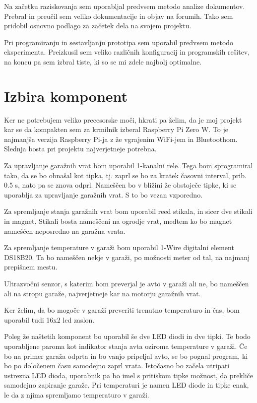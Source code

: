 \documentclass[11pt]{article}
\begin{document}
Na začetku raziskovanja sem uporabljal predvsem metodo analize dokumentov. Prebral in preučil sem veliko dokumentacije in objav na forumih. Tako sem pridobil osnovno podlago za začetek dela na svojem projektu.

Pri programiranju in sestavljanju prototipa sem uporabil predvsem metodo eksperimenta. Preizkusil sem veliko različnih konfiguracij in programskih rešitev, na koncu pa sem izbral tiste, ki so se mi zdele najbolj optimalne.
\newpage

\section{Izbira komponent}
  Ker ne potrebujem veliko precesorske moči, hkrati pa želim, da je moj projekt kar se da kompakten sem za krmilnik izberal Raspberry Pi Zero W. To je najmanjša verzija Raspberry Pi-ja z že vgrajenim WiFi-jem in Bluetoothom. Slednja bosta pri projektu najverjetneje potrebna.

  Za upravljanje garažnih vrat bom uporabil 1-kanalni rele. Tega bom sprogramiral tako, da se bo obnašal kot tipka, tj. zaprl se bo za kratek časovni interval, prib. 0.5 s, nato pa se znova odprl. Nameščen bo v bližini že obstoječe tipke, ki se uporablja za upravljanje garažnih vrat. S to bo vezan vzporedno.

  Za spremljanje stanja garažnih vrat bom uporabil reed stikala, in sicer dve stikali in magnet. Stikali bosta nameščeni na ogrodje vrat, medtem ko bo magnet nameščen neposredno na garažna vrata.

  Za spremljanje temperature v garaži bom uporabil 1-Wire digitalni element DS18B20. Ta bo nameščen nekje v garaži, po možnosti meter od tal, na najmanj prepišnem mestu.

  Ultrazvočni senzor, s katerim bom preverjal je avto v garaži ali ne, bo nameščen ali na stropu garaže, najverjetneje kar na motorju garažnih vrat.

  Ker želim, da bo mogoče v garaži preveriti trenutno temperaturo in čas, bom uporabil tudi 16x2 \gls{lcd} zaslon.

  Poleg že naštetih komponent bo uporabil še dve LED diodi in dve tipki. Te bodo uporabljene paroma kot indikator stanja avta oziroma temperature v garaži. Če bo na primer garaža odprta in bo vanjo pripeljal avto, se bo pognal program, ki bo po določenem času samodejno zaprl vrata. Istočasno bo začela utripati ustrezna LED dioda, uporabnik pa bo imel s pritiskom tipke možnost, da prekliče samodejno zapiranje garaže. Pri temperaturi je namen LED diode in tipke enak, le da z njima spremljamo temperaturo v garaži.
\end{document}
